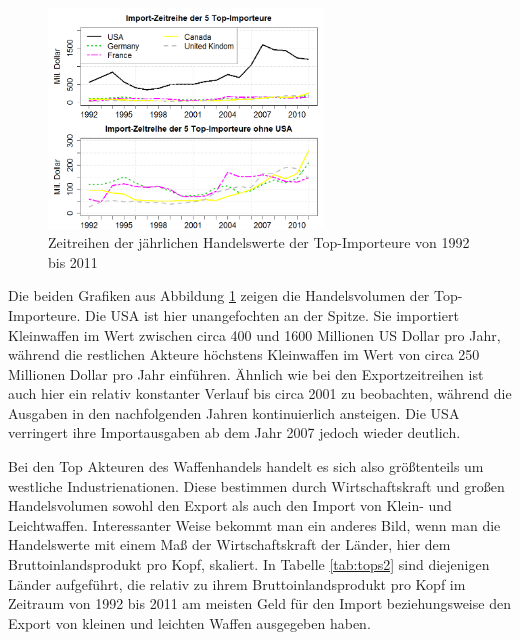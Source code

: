 \documentclass[a4paper,ngerman,oneside,titlepage,bibliography=totoc,11pt]{scrreprt}
\begin{document}
\begin{figure}[h]
\centering
	\includegraphics[width=0.65\textwidth]{Grafiken/ts_topsimp.png}
	\caption{Zeitreihen der jährlichen Handelswerte der Top-Importeure von 1992 bis 2011}
	\label{fig:ts_tops2}
\end{figure}

Die beiden Grafiken aus Abbildung \ref{fig:ts_tops2} zeigen die Handelsvolumen der Top-Importeure. Die USA ist hier unangefochten an der Spitze. Sie importiert Kleinwaffen im Wert zwischen circa 400 und 1600 Millionen US Dollar pro Jahr, während die restlichen Akteure höchstens Kleinwaffen im Wert von circa 250 Millionen Dollar pro Jahr einführen. Ähnlich wie bei den Exportzeitreihen ist auch hier ein relativ konstanter Verlauf bis circa 2001 zu beobachten, während die Ausgaben in den nachfolgenden Jahren kontinuierlich ansteigen. Die USA verringert ihre Importausgaben ab dem Jahr 2007 jedoch wieder deutlich. 

Bei den Top Akteuren des Waffenhandels handelt es sich also größtenteils um westliche Industrienationen. Diese bestimmen durch Wirtschaftskraft und großen Handelsvolumen sowohl den Export als auch den Import von Klein- und Leichtwaffen. Interessanter Weise bekommt man ein anderes Bild, wenn man die Handelswerte mit einem Maß der Wirtschaftskraft der Länder, hier dem Bruttoinlandsprodukt pro Kopf, skaliert. In Tabelle \ref{tab:tops2} sind diejenigen Länder aufgeführt, die relativ zu ihrem Bruttoinlandsprodukt pro Kopf im Zeitraum von 1992 bis 2011 am meisten Geld für den Import beziehungsweise den Export von kleinen und leichten Waffen ausgegeben haben.
\end{document}
